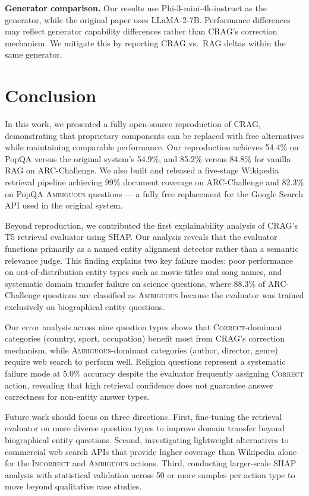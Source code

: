 \documentclass[11pt]{article}
\begin{document}
\textbf{Generator comparison.} Our results use Phi-3-mini-4k-instruct as the generator, while the
original paper uses LLaMA-2-7B. Performance differences may reflect generator capability
differences rather than CRAG's correction mechanism. We mitigate this by reporting CRAG
vs.\ RAG deltas within the same generator.

\clearpage
\section{Conclusion}

In this work, we presented a fully open-source reproduction of CRAG, demonstrating that
proprietary components can be replaced with free alternatives while maintaining comparable
performance. Our reproduction achieves 54.4\% on PopQA versus the original system's 54.9\%, and
85.2\% versus 84.8\% for vanilla RAG on ARC-Challenge. We also built and released a five-stage
Wikipedia retrieval pipeline achieving 99\% document coverage on ARC-Challenge and 82.3\% on PopQA
\textsc{Ambiguous} questions --- a fully free replacement for the Google Search API used in the
original system.

Beyond reproduction, we contributed the first explainability analysis of CRAG's T5 retrieval
evaluator using SHAP. Our analysis reveals that the evaluator functions primarily as a named entity
alignment detector rather than a semantic relevance judge. This finding explains two key failure
modes: poor performance on out-of-distribution entity types such as movie titles and song names,
and systematic domain transfer failure on science questions, where 88.3\% of ARC-Challenge
questions are classified as \textsc{Ambiguous} because the evaluator was trained exclusively on
biographical entity questions.

Our error analysis across nine question types shows that \textsc{Correct}-dominant categories
(country, sport, occupation) benefit most from CRAG's correction mechanism, while
\textsc{Ambiguous}-dominant categories (author, director, genre) require web search to perform
well. Religion questions represent a systematic failure mode at 5.0\% accuracy despite the
evaluator frequently assigning \textsc{Correct} action, revealing that high retrieval confidence
does not guarantee answer correctness for non-entity answer types.

Future work should focus on three directions. First, fine-tuning the retrieval evaluator on more
diverse question types to improve domain transfer beyond biographical entity questions. Second,
investigating lightweight alternatives to commercial web search APIs that provide higher coverage
than Wikipedia alone for the \textsc{Incorrect} and \textsc{Ambiguous} actions. Third, conducting
larger-scale SHAP analysis with statistical validation across 50 or more samples per action type to
move beyond qualitative case studies.
\end{document}
